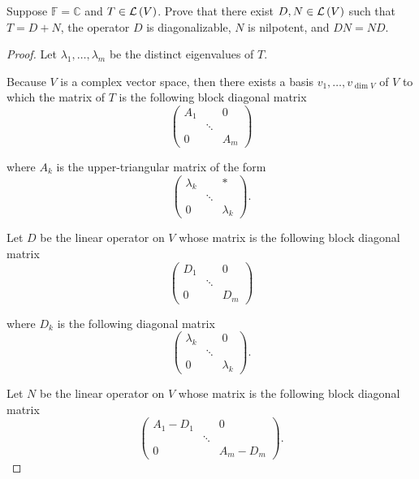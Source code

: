 \begin{exercise}\label{chapter8:sectionB:exercise9}
    Suppose $\mathbb{F} = \mathbb{C}$ and $T\in\mathcal{L}\left({V}\right)$. Prove that there exist $D, N\in \mathcal{L}\left({V}\right)$ such that $T = D + N$, the operator $D$ is diagonalizable, $N$ is nilpotent, and $DN = ND$.
\end{exercise}

\begin{proof}
    Let $\lambda_{1}, \ldots, \lambda_{m}$ be the distinct eigenvalues of $T$.

    Because $V$ is a complex vector space, then there exists a basis $v_{1}, \ldots, v_{\dim V}$ of $V$ to which the matrix of $T$ is the following block diagonal matrix
    \[
        \begin{pmatrix}
            A_{1} &        & 0     \\
                  & \ddots &       \\
            0     &        & A_{m}
        \end{pmatrix}
    \]

    where $A_{k}$ is the upper-triangular matrix of the form
    \[
        \begin{pmatrix}
            \lambda_{k} &        & *           \\
                        & \ddots &             \\
            0           &        & \lambda_{k}
        \end{pmatrix}.
    \]

    Let $D$ be the linear operator on $V$ whose matrix is the following block diagonal matrix
    \[
        \begin{pmatrix}
            D_{1} &        & 0     \\
                  & \ddots &       \\
            0     &        & D_{m}
        \end{pmatrix}
    \]

    where $D_{k}$ is the following diagonal matrix
    \[
        \begin{pmatrix}
            \lambda_{k} &        & 0           \\
                        & \ddots &             \\
            0           &        & \lambda_{k}
        \end{pmatrix}.
    \]

    Let $N$ be the linear operator on $V$ whose matrix is the following block diagonal matrix
    \[
        \begin{pmatrix}
            A_{1} - D_{1} &        & 0             \\
                          & \ddots &               \\
            0             &        & A_{m} - D_{m}
        \end{pmatrix}.
    \]


\end{proof}
